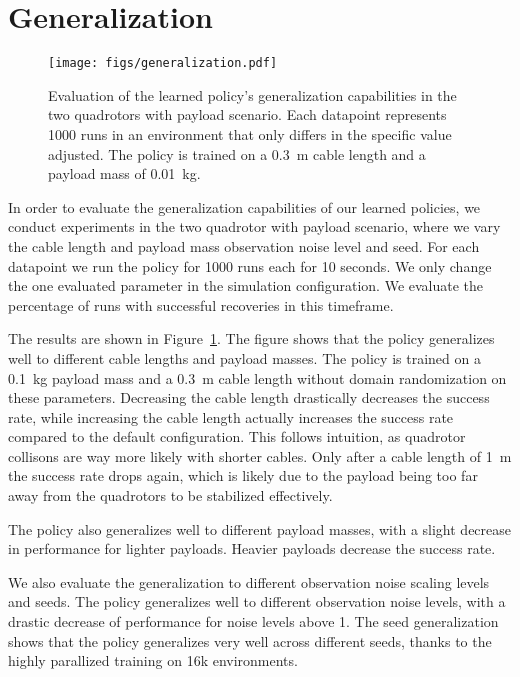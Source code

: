 \section{Generalization}
\begin{figure}[ht]
    \centering
    
    \texttt{[image: figs/generalization.pdf]}
    \caption[Policy Generalization]{Evaluation of the learned policy's generalization capabilities in the two quadrotors with payload scenario. Each datapoint represents 1000 runs in an environment that only differs in the specific value adjusted. The policy is trained on a 0.3~m cable length and a payload mass of 0.01~kg.}
    \label{fig:generalization}
\end{figure}
In order to evaluate the generalization capabilities of our learned policies, we conduct experiments in the two quadrotor with payload scenario, where we vary the cable length and payload mass observation noise level and seed. For each datapoint we run the policy for 1000 runs each for 10 seconds. We only change the one evaluated parameter in the simulation configuration. We evaluate the percentage of runs with successful recoveries in this timeframe.

The results are shown in Figure~\ref{fig:generalization}. The figure shows that the policy generalizes well to different cable lengths and payload masses. The policy is trained on a 0.1~kg payload mass and a 0.3~m cable length without domain randomization on these parameters. Decreasing the cable length drastically decreases the success rate, while increasing the cable length actually increases the success rate compared to the default configuration. This follows intuition, as quadrotor collisons are way more likely with shorter cables. Only after a cable length of 1~m the success rate drops again, which is likely due to the payload being too far away from the quadrotors to be stabilized effectively. 

The policy also generalizes well to different payload masses, with a slight decrease in performance for lighter payloads. Heavier payloads decrease the success rate.

We also evaluate the generalization to different observation noise scaling levels and seeds. The policy generalizes well to different observation noise levels, with a drastic decrease of performance for noise levels above 1. The seed generalization shows that the policy generalizes very well across different seeds, thanks to the highly parallized training on 16k environments.

